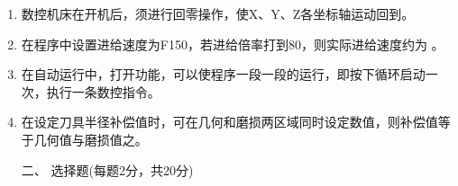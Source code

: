 \documentclass[12pt,twocolumn,landscape,UTF8,twoside]{ctexart}
\begin{document}
\begin{spacing}{1.3}
\begin{enumerate} [1、]
		
		
		\item 数控机床在开机后，须进行回零操作，使X、Y、Z各坐标轴运动回到。
		
		
		\item 在程序中设置进给速度为F150，若进给倍率打到80，则实际进给速度约为	。
		



		\item 在自动运行中，打开功能，可以使程序一段一段的运行，即按下循环启动一次，执行一条数控指令。



		\item 在设定刀具半径补偿值时，可在几何和磨损两区域同时设定数值，则补偿值等于几何值与磨损值之。

		
\vspace{1cm}

\item[\heiti 二、] {\heiti 选择题(每题2分，共20分)}	
		

\end{enumerate}
\end{spacing}
\end{document}
